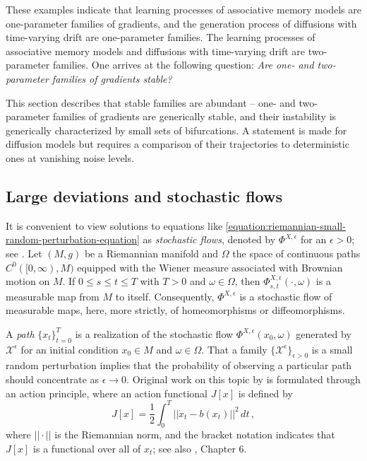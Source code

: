 \documentclass[12pt]{article}
\begin{document}
These examples indicate that learning processes of associative memory models are one-parameter families of gradients, and the generation process of diffusions with time-varying drift are one-parameter families. The learning processes of associative memory models and diffusions with time-varying drift are two-parameter families. One arrives at the following question: \textit{Are one- and two-parameter families of gradients stable?}

This section describes that stable families are abundant -- one- and two-parameter families of gradients are generically stable, and their instability is generically characterized by small sets of bifurcations. A statement is made for diffusion models but requires a comparison of their trajectories to deterministic ones at vanishing noise levels. 



\subsection{Large deviations and stochastic flows}
\label{subsection:paths-large-deviations}
It is convenient to view solutions to equations like \eqref{equation:riemannian-small-random-perturbation-equation} as \textit{stochastic flows}, denoted by $\Phi^{X,\epsilon}$ for an $\epsilon >0$; see \cite{kunita1986lectures}. Let $(M,g)$ be a Riemannian manifold and $\Omega$ the space of continuous paths $C^0([0,\infty),M)$ equipped with the Wiener measure associated with Brownian motion on $M$. If $0 \leq s \leq t \leq T$ with $T>0$ and $\omega \in \Omega$, then $\Phi^{X,\epsilon}_{s,t}(\cdot, \omega)$ is a measurable map from $M$ to itself. Consequently, $\Phi^{X,\epsilon}$ is a stochastic flow of measurable maps, here, more strictly, of homeomorphisms or diffeomorphisms. 

A \textit{path} $\{x_t \}_{t=0}^T$ is a realization of the stochastic flow $\Phi^{X,\epsilon}(x_0,\omega)$ generated by $\mathcal{X}^{\epsilon}$ for an initial condition $x_0\in M$ and $\omega \in \Omega$. That a family $\{\mathcal{X}^{\epsilon}\}_{\epsilon>0}$ is a small random perturbation implies that the probability of observing a particular path should concentrate as $\epsilon \rightarrow 0$. Original work on this topic by \cite{ventsel1970small} is formulated through an action principle, where an action functional $J[x]$ is defined by
\begin{equation*}
    J[x] = \frac{1}{2}\int_0^T || \dot{x}_t - b({x}_t) ||^2 \, dt \, ,
\end{equation*}
where $|| \cdot ||$ is the Riemannian norm, and the bracket notation indicates that $J[x]$ is a functional over all of $x_t$; see also \cite{touchette2009large}, Chapter 6. 
\end{document}
